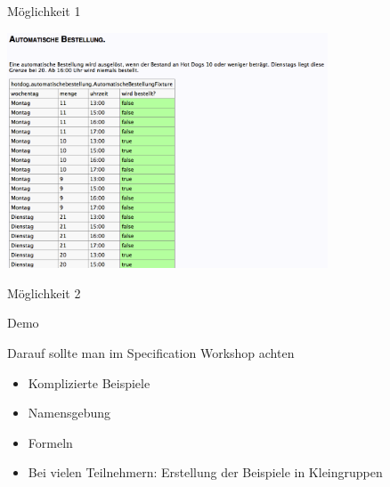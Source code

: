 \begin{frame}{Möglichkeit 1}

\begin{center}
\includegraphics[height=7cm]{SchlechtesBeispiel.png} \newline
\end{center}

\end{frame}

\begin{frame}{Möglichkeit 2}

\begin{center}
\Large
Demo
\end{center}

\end{frame}

\begin{frame}{Darauf sollte man im Specification Workshop achten}

\begin{itemize}
   \item Komplizierte Beispiele
   
   \item Namensgebung
   
   \item Formeln
   
   \item Bei vielen Teilnehmern: Erstellung der Beispiele in Kleingruppen
\end{itemize}


\end{frame}



